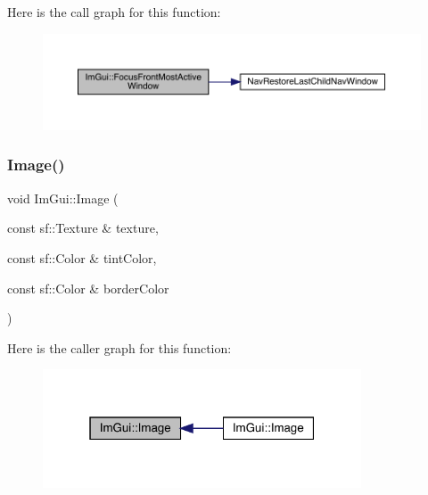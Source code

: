 Here is the call graph for this function\+:
\nopagebreak
\begin{figure}[H]
\begin{center}
\leavevmode
\includegraphics[width=350pt]{df/d13/namespace_im_gui_adc356b6245da18540e77f663c6cee813_cgraph}
\end{center}
\end{figure}
\mbox{\label{namespace_im_gui_a6edd99e13610a7aa37d6befa622a33d5}} 
\subsubsection{\texorpdfstring{Image()}{Image()}\hspace{0.1cm}{\footnotesize\ttfamily [1/6]}}
{\footnotesize\ttfamily void Im\+Gui\+::\+Image (\begin{DoxyParamCaption}\item[{const sf\+::\+Texture \&}]{texture,  }\item[{const sf\+::\+Color \&}]{tint\+Color,  }\item[{const sf\+::\+Color \&}]{border\+Color }\end{DoxyParamCaption})}

Here is the caller graph for this function\+:
\nopagebreak
\begin{figure}[H]
\begin{center}
\leavevmode
\includegraphics[width=268pt]{df/d13/namespace_im_gui_a6edd99e13610a7aa37d6befa622a33d5_icgraph}
\end{center}
\end{figure}
\mbox{\label{namespace_im_gui_ad6ab801840d7c487d66946ceca63632f}} 
